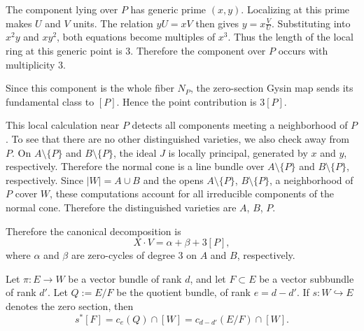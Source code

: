 \documentclass[12pt]{article}
\begin{document}
\begin{example}
The component lying over $P$ has generic prime $(x,y)$. Localizing at this prime makes $U$ and $V$ units. The relation $yU=xV$ then gives $y=x\frac{V}{U}$. Substituting into $x^2y$ and $xy^2$, both equations become multiples of $x^3$. Thus the length of the local ring at this generic point is $3$. Therefore the component over $P$ occurs with multiplicity $3$.

Since this component is the whole fiber $N_P$, the zero-section Gysin map sends its fundamental class to $[P]$. Hence the point contribution is $3[P]$.

This local calculation near $P$ detects all components meeting a neighborhood of $P$. To see that there are no other distinguished varieties, we also check away from $P$. On $A\setminus\{P\}$ and $B\setminus\{P\}$, the ideal $J$ is locally principal, generated by $x$ and $y$, respectively. Therefore the normal cone is a line bundle over $A\setminus\{P\}$ and $B\setminus\{P\}$, respectively. Since $|W|=A\cup B$ and the opens $A\setminus\{P\}$, $B\setminus\{P\}$, a neighborhood of $P$ cover $W$, these computations account for all irreducible components of the normal cone. Therefore the distinguished varieties are $A$, $B$, $P$.

Therefore the canonical decomposition is
$$X\cdot V = \alpha+\beta+3[P],$$
where $\alpha$ and $\beta$ are zero-cycles of degree $3$ on $A$ and $B$, respectively.
\end{example}

\begin{proposition}\label{prop:excess-intersection-vector-bundles}
    Let $\pi:E\to W$ be a vector bundle of rank $d$, and let $F\subset E$ be a vector subbundle of rank $d'$. Let $Q:=E/F$ be the quotient bundle, of rank $e=d-d'$. If $s:W\hookrightarrow E$ denotes the zero section, then
$$s^*[F] = c_e(Q)\cap [W] = c_{d-d'}(E/F)\cap [W].$$
\end{proposition}
\end{document}
